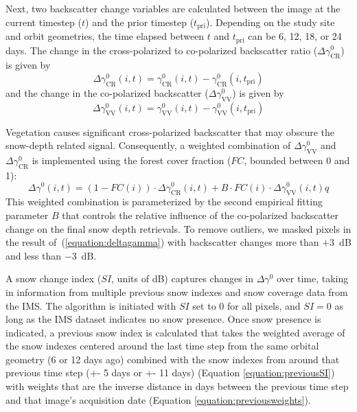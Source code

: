 \documentclass[journal abbreviation, manuscript]{copernicus}
\begin{document}
Next, two backscatter change variables are calculated between the image at the current timestep ($t$) and the prior timestep ($t_{\mathrm{pri}}$). Depending on the study site and orbit geometries, the time elapsed between $t$ and $t_{\mathrm{pri}}$ can be 6, 12, 18, or 24 days. The change in the cross-polarized to co-polarized backscatter ratio ($\Delta \gamma^0_{\mathrm{CR}}$) is given by
\begin{equation} \label{equation:deltaCR}
    \Delta \gamma^0_{\mathrm{CR}} (i, t) = \gamma^0_{\mathrm{CR}} (i, t) - \gamma^0_{\mathrm{CR}} (i, t_{\mathrm{pri}})
\end{equation}
and the change in the co-polarized backscatter ($\Delta \gamma^0_{\mathrm{VV}}$) is given by 
\begin{equation} \label{equation:deltaVV}
    \Delta \gamma^0_{\mathrm{VV}} (i, t) = \gamma^0_{\mathrm{VV}} (i, t) - \gamma^0_{\mathrm{VV}} (i, t_{\mathrm{pri}})
\end{equation}

Vegetation causes significant cross-polarized backscatter that may obscure the snow-depth related signal. Consequently, a weighted combination of $\Delta \gamma^0_{\mathrm{VV}}$ and $\Delta \gamma^0_{\mathrm{CR}}$ is implemented using the forest cover fraction ($FC$, bounded between 0 and 1): 
\begin{equation} \label{equation:deltagamma}
    \Delta \gamma^0 (i, t) = (1 - FC(i)) \cdot \Delta \gamma^0_{\mathrm{CR}} (i, t) + B \cdot FC(i) \cdot \Delta \gamma^0_{\mathrm{VV}} (i, t)q   
\end{equation}
This weighted combination is parameterized by the second empirical fitting parameter $B$ that controls the relative influence of the co-polarized backscatter change on the final snow depth retrievals. To remove outliers, we masked pixels in the result of~(\ref{equation:deltagamma}) with backscatter changes more than $+$3~dB and less than $-$3~dB.

A snow change index ($SI$, units of dB) captures changes in $\Delta \gamma^0$ over time, taking in information from multiple previous snow indexes and snow coverage data from the IMS. The algorithm is initiated with $SI$ set to 0 for all pixels, and $SI=0$ as long as the IMS dataset indicates no snow presence. Once snow presence is indicated, a previous snow index is calculated that takes the weighted average of the snow indexes centered around the last time step from the same orbital geometry (6 or 12 days ago) combined with the snow indexes from around that previous time step (+- 5 days or +- 11 days) (Equation \ref{equation:previousSI}) with weights that are the inverse distance in days between the previous time step and that image’s acquisition date (Equation \ref{equation:previousweights}).
\end{document}
